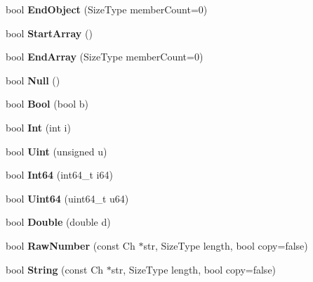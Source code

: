 \begin{Indent}
\begin{DoxyCompactItemize}
\mbox{\label{classPrettyWriter_a5837a63cac4735eaeedbaff287e1ab9e}} 
bool {\bfseries End\+Object} (Size\+Type member\+Count=0)
\item 
\mbox{\label{classPrettyWriter_a12dd02678ab52b9061bb6ac01cca2601}} 
bool {\bfseries Start\+Array} ()
\item 
\mbox{\label{classPrettyWriter_a5196275e826a37a163d178da612f58f9}} 
bool {\bfseries End\+Array} (Size\+Type member\+Count=0)
\item 
\mbox{\label{classPrettyWriter_acbcab646050e5e9204ab2b13c798092b}} 
bool {\bfseries Null} ()
\item 
\mbox{\label{classPrettyWriter_afddf1586eeba72bc4fbb0e1346ced9b9}} 
bool {\bfseries Bool} (bool b)
\item 
\mbox{\label{classPrettyWriter_a14da2a84e9f41ba42edf2819363be614}} 
bool {\bfseries Int} (int i)
\item 
\mbox{\label{classPrettyWriter_a65227d9de9a9f92eb3ca83c616a9c809}} 
bool {\bfseries Uint} (unsigned u)
\item 
\mbox{\label{classPrettyWriter_a2ce0d71e221d72b8cf17d2b60ae610af}} 
bool {\bfseries Int64} (int64\+\_\+t i64)
\item 
\mbox{\label{classPrettyWriter_a888229dc2e5a15b2fd577b47e86a17b3}} 
bool {\bfseries Uint64} (uint64\+\_\+t u64)
\item 
\mbox{\label{classPrettyWriter_a20ffcf3ada1be664719f44cec76711ed}} 
bool {\bfseries Double} (double d)
\item 
\mbox{\label{classPrettyWriter_a130e551b77217f2082deb9d014f46719}} 
bool {\bfseries Raw\+Number} (const Ch $\ast$str, Size\+Type length, bool copy=false)
\item 
\mbox{\label{classPrettyWriter_ae6cec4b69e86cff3121451f29e4862ef}} 
bool {\bfseries String} (const Ch $\ast$str, Size\+Type length, bool copy=false)

\end{DoxyCompactItemize}
\end{Indent}

